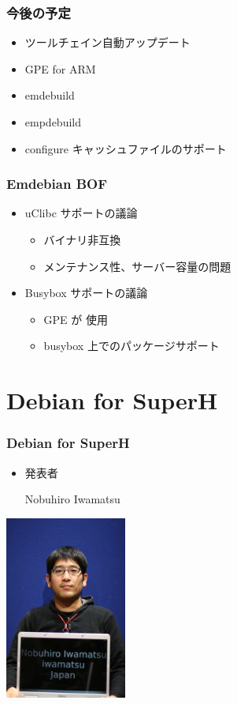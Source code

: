 \documentclass[cjk,dvipdfmx,12pt]{beamer}
\begin{document}
\begin{frame} 
\frametitle{今後の予定}
  \begin{itemize}
    \item ツールチェイン自動アップデート
    \item GPE for ARM
    \item emdebuild
    \item empdebuild
    \item configure キャッシュファイルのサポート 
  \end{itemize}
\end{frame}


\begin{frame} 
\frametitle{Emdebian BOF}
  \begin{itemize}
    \item uClibc サポートの議論
	\begin{itemize}
	  \item バイナリ非互換
	  \item メンテナンス性、サーバー容量の問題
	\end{itemize}
    \item Busybox サポートの議論
	\begin{itemize}
	  \item GPE が 使用
	  \item busybox 上でのパッケージサポート
	\end{itemize}
  \end{itemize}
\end{frame}


\section{Debian for SuperH}
\begin{frame}
\frametitle{Debian for SuperH} 
  \begin{minipage}{0.4\hsize}
    \begin{itemize}
      \item 発表者

	Nobuhiro Iwamatsu
    \end{itemize}
  \end{minipage}
  \begin{minipage}{0.4\hsize}
    \includegraphics[width=4cm]{image200707/iwamatsu.jpg}  
  \end{minipage}
\end{frame}
\end{document}
